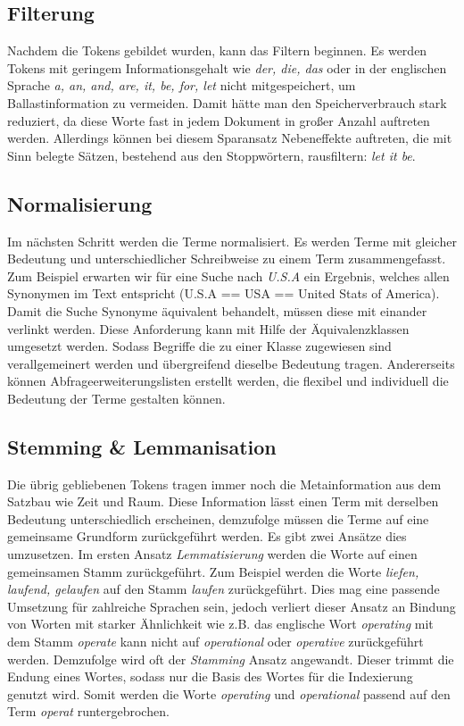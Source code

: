 \subsection[Filterung]{Filterung}

Nachdem die Tokens gebildet wurden, kann das Filtern beginnen. Es werden
Tokens mit geringem Informationsgehalt wie \textit{der, die, das} oder in der
englischen Sprache \textit{a, an, and, are, it, be, for, let} nicht
mitgespeichert, um Ballastinformation zu vermeiden. Damit hätte man den
Speicherverbrauch stark reduziert, da diese Worte fast in jedem
Dokument in großer Anzahl auftreten werden. Allerdings können bei
diesem Sparansatz Nebeneffekte auftreten, die mit Sinn belegte Sätzen,
bestehend aus den Stoppwörtern, rausfiltern: \textit{let it be}. 

\subsection[Normalisierung ]{Normalisierung }
Im nächsten Schritt werden die Terme normalisiert. Es werden Terme mit
gleicher Bedeutung und unterschiedlicher Schreibweise zu einem Term
zusammengefasst. Zum Beispiel erwarten wir für eine Suche nach \textit{U.S.A}
ein Ergebnis, welches allen Synonymen im Text entspricht (U.S.A == USA
== United Stats of America). 
\newline
Damit die Suche Synonyme äquivalent behandelt, müssen diese mit einander
verlinkt werden. Diese Anforderung kann mit Hilfe der Äquivalenzklassen
umgesetzt werden. Sodass Begriffe die zu einer Klasse zugewiesen sind 
verallgemeinert werden und übergreifend dieselbe Bedeutung tragen.
Andererseits können Abfrageerweiterungslisten erstellt werden, die
flexibel und individuell die Bedeutung der Terme gestalten können.


\subsection[Stemming \& Lemmanisation]{Stemming \& Lemmanisation}
Die übrig gebliebenen Tokens tragen immer noch die Metainformation aus
dem Satzbau wie Zeit und Raum. Diese Information lässt einen Term mit
derselben Bedeutung unterschiedlich erscheinen, demzufolge müssen die
Terme auf eine gemeinsame Grundform zurückgeführt werden. 
\bigbreak
Es gibt zwei Ansätze dies umzusetzen. Im ersten Ansatz \textit{Lemmatisierung}
werden die Worte auf einen gemeinsamen Stamm zurückgeführt. Zum
Beispiel werden die Worte \textit{liefen, laufend, gelaufen} auf den Stamm
\textit{laufen} zurückgeführt. Dies mag eine passende Umsetzung für zahlreiche
Sprachen sein, jedoch verliert dieser Ansatz an Bindung von Worten mit
starker Ähnlichkeit wie z.B. das englische Wort \textit{operating} mit dem
Stamm \textit{operate} kann nicht auf \textit{operational} oder \textit{operative}
zurückgeführt werden. Demzufolge wird oft der \textit{Stamming} Ansatz
angewandt. Dieser trimmt die Endung eines Wortes, sodass nur die Basis
des Wortes für die Indexierung genutzt wird. Somit werden die Worte
\textit{operating} und \textit{operational} passend auf den Term \textit{operat}
runtergebrochen.

